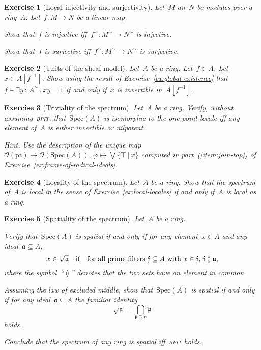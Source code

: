 \documentclass{ws-rv9x6}
\newtheorem{ex}{Exercise}
\newenvironment{exercise}[1]{
  \begin{ex}[#1]
}{\end{ex}}
\renewcommand{\O}{\mathcal{O}}
\newcommand{\aaa}{\mathfrak{a}}
\newcommand{\ppp}{\mathfrak{p}}
\newcommand{\fff}{\mathfrak{f}}
\newcommand{\Spec}{\mathrm{Spec}}
\renewcommand{\_}{\mathpunct{.}}
\newcommand{\?}{\,{:}\,}
\newcommand{\pt}{\mathrm{pt}}
\newcommand{\BPIT}{\textsc{bpit}\xspace}
\begin{document}
\begin{exercise}{Local injectivity and surjectivity}%
Let~$M$ an~$N$ be modules over a ring~$A$. Let~$f : M \to N$ be a linear map.
\begin{alphlist}[(b)]
\item Show that~$f$ is injective iff~$f^\sim : M^\sim \to N^\sim$ is injective.
\item Show that~$f$ is surjective iff~$f^\sim : M^\sim \to N^\sim$ is surjective.
\end{alphlist}
\end{exercise}

\begin{exercise}{Units of the sheaf model}%
Let~$A$ be a ring. Let~$f \in A$. Let~$x \in A[f^{-1}]$. Show using the result
of Exercise~\ref{ex:global-existence} that~$f \models \exists y\?A^\sim\_ xy
= 1$ if and only if~$x$ is invertible in~$A[f^{-1}]$.
\end{exercise}

\begin{exercise}{Triviality of the spectrum}%
Let~$A$ be a ring. Verify, without assuming~\BPIT, that~$\Spec(A)$ is
isomorphic to the one-point locale iff any element of~$A$ is either
invertible or nilpotent.\smallskip

{\noindent\scriptsize\emph{Hint.} Use the description of the unique map~$\O(\pt) \to
\O(\Spec(A)),\,\varphi \mapsto \bigvee\{\top\,|\,\varphi\}$ computed in
part~(\ref{item:join-top}) of Exercise~\ref{ex:frame-of-radical-ideals}.\par}
\end{exercise}

\begin{exercise}{Locality of the spectrum}%
Let~$A$ be a ring. Show that the spectrum of~$A$ is local in the sense of
Exercise~\ref{ex:local-locales} if and only if~$A$ is local as a ring.
\end{exercise}

\begin{exercise}{Spatiality of the spectrum}%
Let~$A$ be a ring.
\begin{alphlist}[(c)]
\item Verify that~$\Spec(A)$ is spatial if and only if for any element~$x \in
A$ and any ideal~$\aaa \subseteq A$,
\[ x \in \sqrt{\aaa} \quad\textnormal{if}\quad
\text{for all prime filters~$\fff \subseteq A$ with~$x \in \fff$, $\fff \between \aaa$}, \]
where the symbol~``$\between$'' denotes that the two sets have an element in common.
\item Assuming the law of excluded middle, show that~$\Spec(A)$ is spatial if
and only if for any ideal~$\aaa \subseteq A$ the familiar identity
\[ \sqrt{\aaa} = \bigcap_{\ppp \supseteq \aaa} \ppp \]
holds.
\item Conclude that the spectrum of any ring is spatial iff~\BPIT holds.
\end{alphlist}
\end{exercise}
\end{document}
